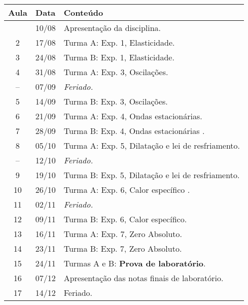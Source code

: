 \begin{center}
\begin{longtable}{ccp{70mm}}
\toprule
Aula & Data & Conteúdo \\
\midrule
\endhead
\bottomrule
\endfoot
 1 & 10/08 & Apresentação da disciplina. \\
 2 & 17/08 & Turma A: Exp. 1, Elasticidade. \\
 3 & 24/08 & Turma B: Exp. 1, Elasticidade. \\
 4 & 31/08 & Turma A: Exp. 3, Oscilações. \\
-- & 07/09 & \emph{Feriado.} \\
 5 & 14/09 & Turma B: Exp. 3, Oscilações. \\
 6 & 21/09 & Turma A: Exp. 4, Ondas estacionárias. \\
 7 & 28/09 & Turma B: Exp. 4, Ondas estacionárias . \\
 8 & 05/10 & Turma A: Exp. 5, Dilatação e lei de resfriamento. \\
-- & 12/10 & \emph{Feriado.} \\
 9 & 19/10 & Turma B: Exp. 5, Dilatação e lei de resfriamento. \\
10 & 26/10 & Turma A: Exp. 6, Calor específico . \\
11 & 02/11 & \emph{Feriado.} \\
12 & 09/11 & Turma B: Exp. 6, Calor específico. \\ 
13 & 16/11 & Turma A: Exp. 7, Zero Absoluto. \\
14 & 23/11 & Turma B: Exp. 7, Zero Absoluto. \\
15 & 24/11 & Turmas A e B: \textbf{Prova de laboratório}. \\
16 & 07/12 & Apresentação das notas finais de laboratório. \\
17 & 14/12 & Feriado. \\
\end{longtable}
\end{center}

\clearpage


